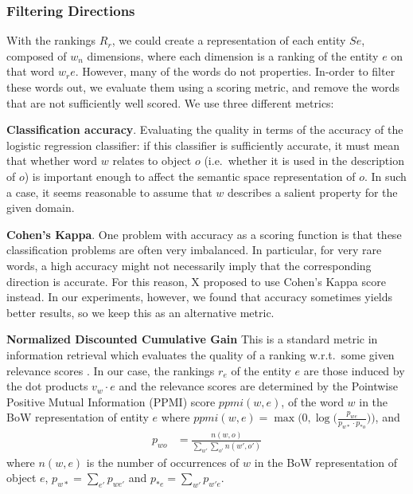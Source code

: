 \subsubsection{Filtering Directions}
With the rankings $R_r$, we could create a representation of each entity $Se$,   composed of $w_n$ dimensions, where each dimension is a ranking of the entity $e$ on that word $w_re$. However, many of the words do not  properties. In-order to filter these words out, we evaluate them using a scoring metric, and remove the words that are not sufficiently well scored. We use three different metrics:

\noindent \textbf{Classification accuracy}. Evaluating the quality in terms of the accuracy of the logistic regression classifier: if this classifier is sufficiently accurate, it must mean that whether word $w$ relates to object $o$ (i.e.\ whether it is used in the description of $o$) is important enough to affect the semantic space representation of $o$. In such a case, it seems reasonable to assume that $w$ describes a salient property for the given domain.%
\smallskip

\noindent \textbf{Cohen's Kappa}. One problem with accuracy as a scoring function is that these classification problems are often very imbalanced. In particular, for very rare words, a high accuracy might not necessarily imply that the corresponding direction is accurate. For this reason, X proposed to use Cohen's Kappa score instead. In our experiments, however, we found that accuracy sometimes yields better results, so we keep this as an alternative metric. %
\smallskip

\noindent \textbf{Normalized Discounted Cumulative Gain}
This is a standard metric in information retrieval which evaluates the quality of a ranking w.r.t.\ some given relevance scores \cite{jarvelin2002cumulated}.  In our case, the rankings $r_e$ of the entity $e$ are those induced by the dot products $v_w \cdot e$ and the relevance scores are determined by the Pointwise Positive Mutual Information (PPMI) score $\textit{ppmi}(w,e)$, of the word $w$ in the BoW representation of entity $e$ where
$\textit{ppmi}(w,e) = \max \big(0, \log\big(\frac{p_{we}}{p_{w*} \cdotp p_{*o}}\big)\big)$, and
\begin{align*}
p_{wo} &= \frac{n(w, o)}{\sum_{w'} \sum_{o'} n(w', o')}
\end{align*}
where $n(w,e)$ is the number of occurrences of $w$ in the BoW representation of object $e$, $p_{w*} = \sum_{e'} p_{we'}$ and $p_{*e} = \sum_{w'} p_{w'e}$. %
\smallskip

